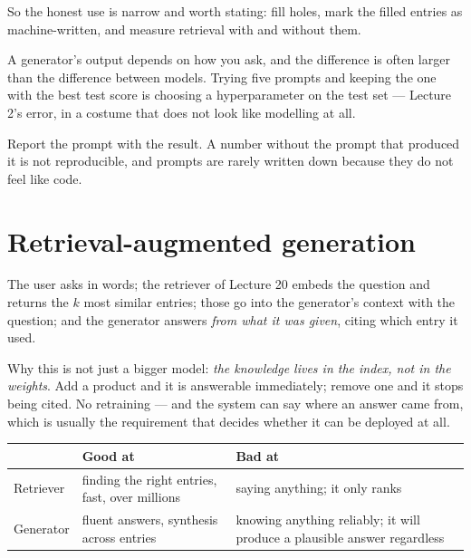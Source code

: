 \documentclass[11pt,a4paper]{article}
\begin{document}
So the honest use is narrow and worth stating: fill holes, mark the filled
entries as machine-written, and measure retrieval with and without them.

\begin{keybox}[title={Prompting is a hyperparameter}]
A generator's output depends on how you ask, and the difference is often larger
than the difference between models. Trying five prompts and keeping the one
with the best test score is choosing a hyperparameter on the test set ---
Lecture 2's error, in a costume that does not look like modelling at all.

Report the prompt with the result. A number without the prompt that produced it
is not reproducible, and prompts are rarely written down because they do not
feel like code.
\end{keybox}

\section{Retrieval-augmented generation}

The user asks in words; the retriever of Lecture 20 embeds the question and
returns the $k$ most similar entries; those go into the generator's context
with the question; and the generator answers \emph{from what it was given},
citing which entry it used.

Why this is not just a bigger model: \emph{the knowledge lives in the index,
not in the weights}. Add a product and it is answerable immediately; remove one
and it stops being cited. No retraining --- and the system can say where an
answer came from, which is usually the requirement that decides whether it can
be deployed at all.

\begin{center}
\small
\begin{tabular}{lp{}p{}}
\toprule
& \textbf{Good at} & \textbf{Bad at} \\
\midrule
Retriever & finding the right entries, fast, over millions &
            saying anything; it only ranks \\
Generator & fluent answers, synthesis across entries &
            knowing anything reliably; it will produce a plausible answer
            regardless \\
\bottomrule
\end{tabular}
\end{center}
\end{document}
